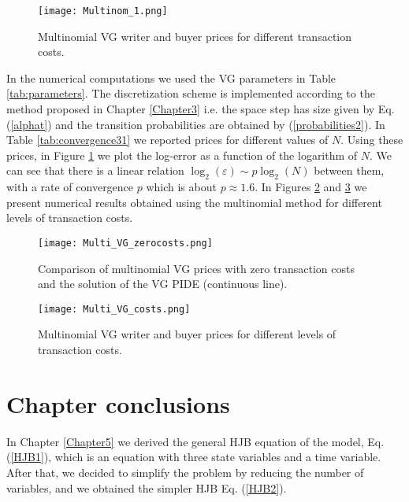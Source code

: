 \begin{figure}[t!]
  \centering
   \texttt{[image: Multinom\_1.png]}
   \caption{Multinomial VG writer and buyer prices for different transaction costs.}
   \label{Fig37}
\end{figure}  
In the numerical computations we used the VG parameters in Table \ref{tab:parameters}. 
The discretization scheme is implemented according to the method proposed in Chapter \ref{Chapter3} i.e. the space step has size given by Eq. (\ref{alphat}) and 
the transition probabilities are obtained by (\ref{probabilities2}). 
In Table \ref{tab:convergence31} we reported prices for different values of $N$.
Using these prices, in Figure \ref{Fig37} we plot the log-error as a function of the logarithm of $N$. We can see that there is a linear relation 
$\log_2(\varepsilon) \sim p \log_2(N)$ between them, with a rate of convergence $p$ which is about $p \approx 1.6$. 
In Figures \ref{Fig32} and \ref{Fig33} we present numerical results obtained using the multinomial method for different levels of transaction costs. 
\begin{figure}[t!]
   \centering
   \texttt{[image: Multi\_VG\_zerocosts.png]}
   \caption{Comparison of multinomial VG prices with zero transaction costs and the solution of the VG PIDE (continuous line).}
   \label{Fig32} 
\end{figure}
\begin{figure}[t!]
  \centering
   \texttt{[image: Multi\_VG\_costs.png]}
   \caption{Multinomial VG writer and buyer prices for different levels of transaction costs.}
   \label{Fig33}
\end{figure}  






\section{Chapter conclusions}


In Chapter \ref{Chapter5} we derived the general HJB equation of the model, Eq. (\ref{HJB1}), which is 
an equation with three state variables and a time variable. 
After that, we decided to simplify the problem by reducing the number of variables, and we obtained the simpler HJB Eq. (\ref{HJB2}).

